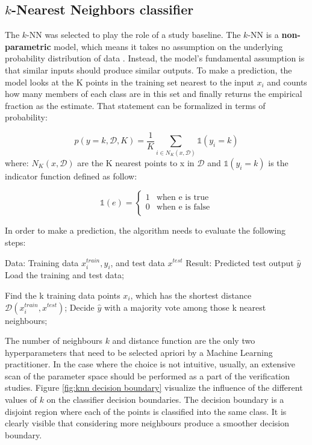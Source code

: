 \subsection{$k$-Nearest Neighbors classifier}
\label{sec:knn}
The $k$-NN was selected to play the role of a study baseline. The $k$-NN  is a \textbf{non-parametric} model, which means it takes no assumption on the underlying probability distribution of data \cite{knn}. 
Instead, the model's fundamental assumption is that similar inputs should produce similar outputs. To make a prediction, the model looks at the K points in the training set nearest to the input $x_i$ and counts how many members of each class are in this set and finally returns the empirical fraction as the estimate. That statement can be formalized in terms of probability:  

\begin{equation}
p(y=k,\mathcal{D}, K) = \frac{1}{K} \sum_{i\in N_K(x,\mathcal{D})} \mathds{1}(y_i=k)
\end{equation}
where: 
$N_K(x,\mathcal{D})$ are the K nearest points to x in $\mathcal{D}$ and $\mathds{1}(y_i=k)$ is the indicator function defined as follow: 

\begin{equation}
    \mathds{1}(e) = \left\{ \begin{array}{ll}
1 & \textrm{when e is true}\\
0 & \textrm{when e is false}\\
\end{array} \right.
\end{equation}

In order to make a prediction, the algorithm needs to evaluate the following steps: 
\begin{algorithm}[caption={k-nearest neighbour, $k$-NN }, label={knn}]
Data: Training data ${x^{train}_{i} , y_{i}}$, and test data ${x^{test}}$
Result: Predicted test output $\hat{y}$
Load the training and test data;

Find the k training data points $x_i$, which has the shortest distance$\mathcal{D}(x^{train}_i, x^{test})$;
Decide $\hat{y}$ with a majority vote among those k nearest neighbours;  
\end{algorithm}

The number of neighbours $k$ and distance function are the only two hyperparameters that need to be selected apriori by a Machine Learning practitioner. In the case where the choice is not intuitive, usually, an extensive scan of the parameter space should be performed as a part of the verification studies. Figure \ref{fig:knn decision boundary} visualize the influence of the different values of $k$ on the classifier decision boundaries. The decision boundary is a disjoint region where each of the points is classified into the same class. It is clearly visible that considering more neighbours produce a smoother decision boundary. 

